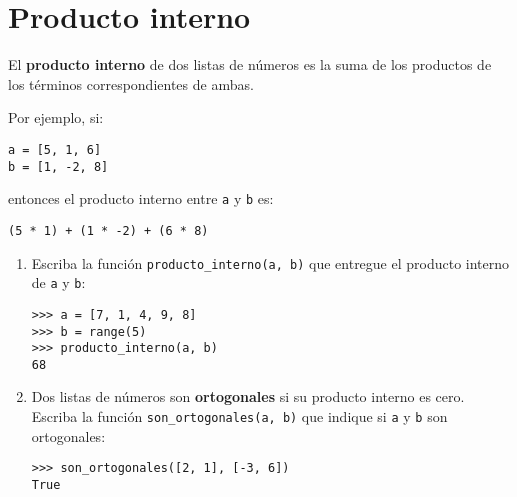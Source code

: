 \section{Producto interno}

El \textbf{producto interno} de dos listas de números es la suma de los
productos de los términos correspondientes de ambas.

Por ejemplo, si:

\begin{lstlisting}
a = [5, 1, 6]
b = [1, -2, 8]
\end{lstlisting}

entonces el producto interno entre \lstinline!a! y \lstinline!b! es:

\begin{lstlisting}
(5 * 1) + (1 * -2) + (6 * 8)
\end{lstlisting}

\begin{enumerate}[1.]
\item
  Escriba la función \lstinline!producto_interno(a, b)! que entregue el
  producto interno de \lstinline!a! y \lstinline!b!:

\begin{lstlisting}
>>> a = [7, 1, 4, 9, 8]
>>> b = range(5)
>>> producto_interno(a, b)
68
\end{lstlisting}
\item
  Dos listas de números son \textbf{ortogonales} si su producto interno
  es cero. Escriba la función \lstinline!son_ortogonales(a, b)! que
  indique si \lstinline!a! y \lstinline!b! son ortogonales:

\begin{lstlisting}
>>> son_ortogonales([2, 1], [-3, 6])
True
\end{lstlisting}
\end{enumerate}
